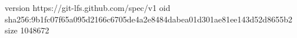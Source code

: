 version https://git-lfs.github.com/spec/v1
oid sha256:9b1fc07f65a095d2166c6705de4a2e8484dabea01d301ae81ee143d52d8655b2
size 1048672
